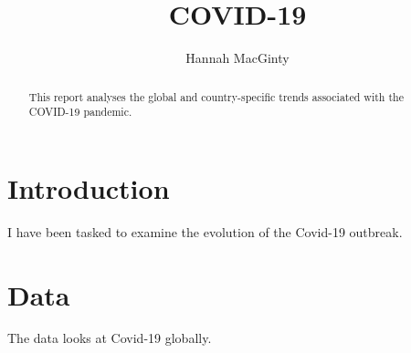 \documentclass[11pt,preprint, authoryear]{elsarticle}
\numberwithin{equation}{section}
\numberwithin{figure}{section}
\numberwithin{table}{section}
\begin{document}
\begin{frontmatter}  %

\title{COVID-19}





\author[Add1]{Hannah MacGinty}





\address[Add1]{Stellenbosch, South Africa}


\begin{abstract}
\small{
This report analyses the global and country-specific trends associated
with the COVID-19 pandemic.
}
\end{abstract}

\vspace{1cm}





\vspace{0.5cm}

\end{frontmatter}

\setcounter{footnote}{0}



\pagestyle{fancy}
\chead{}
\rhead{}
\lfoot{}
\rfoot{}
\lhead{}
\cfoot{}


\headsep 35pt %




\hypertarget{introduction}{%
\section{\texorpdfstring{Introduction
\label{Introduction}}{Introduction }}\label{introduction}}

I have been tasked to examine the evolution of the Covid-19 outbreak.

\hypertarget{data}{%
\section*{Data}\label{data}}

The data looks at Covid-19 globally.
\end{document}
